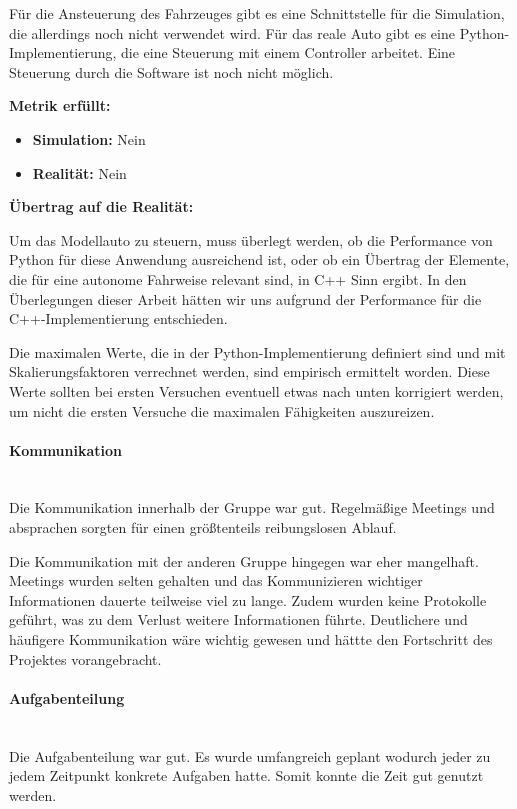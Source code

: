 \begin{enumerate}[leftmargin=*]
    Für die Ansteuerung des Fahrzeuges gibt es eine Schnittstelle für die Simulation, die allerdings noch nicht verwendet wird.
    Für das reale Auto gibt es eine Python-Implementierung, die eine Steuerung mit einem Controller arbeitet. 
    Eine Steuerung durch die Software ist noch nicht möglich.

    \textbf{Metrik erfüllt:}
    \begin{itemize}
        \item \textbf{Simulation:} Nein
        \item \textbf{Realität:} Nein
    \end{itemize}
    
    \textbf{Übertrag auf die Realität:}

    Um das Modellauto zu steuern, muss überlegt werden, ob die Performance von Python für diese Anwendung ausreichend ist, 
    oder ob ein Übertrag der Elemente, die für eine autonome Fahrweise relevant sind, in C++ Sinn ergibt. 
    In den Überlegungen dieser Arbeit hätten wir uns aufgrund der Performance für die C++-Implementierung entschieden.

    Die maximalen Werte, die in der Python-Implementierung definiert sind und mit Skalierungsfaktoren verrechnet werden, 
    sind empirisch ermittelt worden. Diese Werte sollten bei ersten Versuchen eventuell etwas nach unten korrigiert werden,
    um nicht die ersten Versuche die maximalen Fähigkeiten auszureizen.
\end{enumerate}

\paragraph{Kommunikation} \mbox{}\\
Die Kommunikation innerhalb der Gruppe war gut.
Regelmäßige Meetings und absprachen sorgten für einen größtenteils reibungslosen Ablauf.

Die Kommunikation mit der anderen Gruppe hingegen war eher mangelhaft.
Meetings wurden selten gehalten und das Kommunizieren wichtiger Informationen dauerte teilweise viel zu lange.
Zudem wurden keine Protokolle geführt, was zu dem Verlust weitere Informationen führte.
Deutlichere und häufigere Kommunikation wäre wichtig gewesen und hättte den Fortschritt des Projektes vorangebracht.

\paragraph{Aufgabenteilung} \mbox{}\\
Die Aufgabenteilung war gut.
Es wurde umfangreich geplant wodurch jeder zu jedem Zeitpunkt konkrete Aufgaben hatte.
Somit konnte die Zeit gut genutzt werden.

